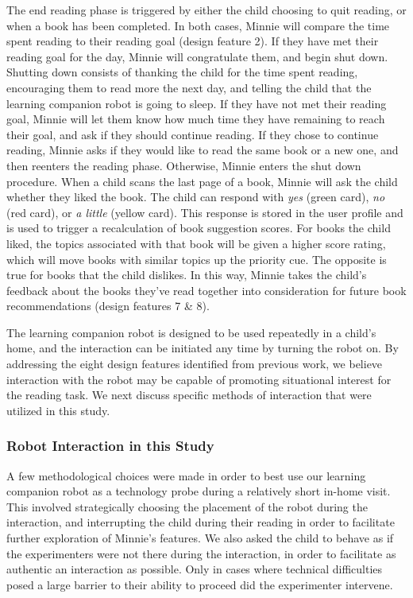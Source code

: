 \documentclass{sigchi}
\begin{document}
The end reading phase is triggered by either the child choosing to quit reading, or when a book has been completed. In both cases, Minnie will compare the time spent reading to their reading goal (design feature 2). If they have met their reading goal for the day, Minnie will congratulate them, and begin shut down. Shutting down consists of thanking the child for the time spent reading, encouraging them to read more the next day, and telling the child that the learning companion robot is going to sleep. If they have not met their reading goal, Minnie will let them know how much time they have remaining to reach their goal, and ask if they should continue reading. If they chose to continue reading, Minnie asks if they would like to read the same book or a new one, and then reenters the reading phase. Otherwise, Minnie enters the shut down procedure. When a child scans the last page of a book, Minnie will ask the child whether they liked the book. The child can respond with \textit{yes} (green card), \textit{no} (red card), or \textit{a little} (yellow card). This response is stored in the user profile and is used to trigger a recalculation of book suggestion scores. For books the child liked, the topics associated with that book will be given a higher score rating, which will move books with similar topics up the priority cue. The opposite is true for books that the child dislikes. In this way, Minnie takes the child's feedback about the books they've read together into consideration for future book recommendations (design features 7 \& 8).

The learning companion robot is designed to be used repeatedly in a child's home, and the interaction can be initiated any time by turning the robot on. By addressing the eight design features identified from previous work, we believe interaction with the robot may be capable of promoting situational interest for the reading task. We next discuss specific methods of interaction that were utilized in this study.

\subsubsection{Robot Interaction in this Study}
A few methodological choices were made in order to best use our learning companion robot as a technology probe during a relatively short in-home visit. This involved strategically choosing the placement of the robot during the interaction, and interrupting the child during their reading in order to facilitate further exploration of Minnie's features. We also asked the child to behave as if the experimenters were not there during the interaction, in order to facilitate as authentic an interaction as possible. Only in cases where technical difficulties posed a large barrier to their ability to proceed did the experimenter intervene.
\end{document}
